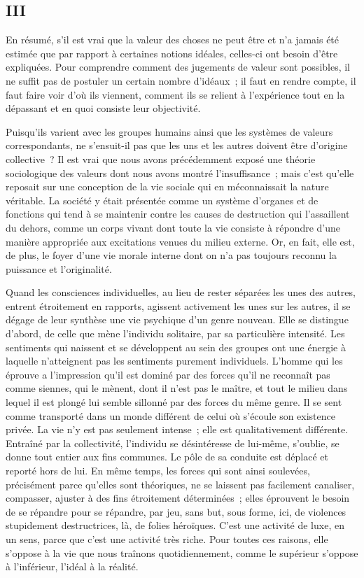 \documentclass[french,twoside]{book} %
\begin{document}
\subsection[{III}]{III}
\noindent En résumé, s’il est vrai que la valeur des choses ne peut être et n’a jamais été estimée que par rapport à certaines notions idéales, celles-ci ont besoin d’être expliquées. Pour comprendre comment des jugements de valeur sont possibles, il ne suffit pas de postuler un certain nombre d’idéaux ; il faut en rendre compte, il faut faire voir d’où ils viennent, comment ils se relient à l’expérience tout en la dépassant et en quoi consiste leur objectivité.\par
Puisqu’ils varient avec les groupes humains ainsi que les systèmes de valeurs correspondants, ne s’ensuit-il pas que les uns et les autres doivent être d’origine collective ? Il est vrai que nous avons précédemment exposé une théorie sociologique des valeurs dont nous avons montré l’insuffisance ; mais c’est qu’elle reposait sur une conception de la vie sociale qui en méconnaissait la nature véritable. La société y était présentée comme un système d’organes et de fonctions qui tend à se maintenir contre les causes de destruction qui l’assaillent du dehors, comme un corps vivant dont toute la vie consiste à répondre d’une manière appropriée aux excitations venues du milieu externe. Or, en fait, elle est, de plus, le foyer d’une vie morale interne dont on n’a pas toujours reconnu la puissance et l’originalité.\par
Quand les consciences individuelles, au lieu de rester séparées les unes des autres, entrent étroitement en rapports, agissent activement les unes sur les autres, il se dégage de leur synthèse une vie psychique d’un genre nouveau. Elle se distingue d’abord, de celle que mène l’individu solitaire, par sa particulière intensité. Les sentiments qui naissent et se développent au sein des groupes ont une énergie à laquelle n’atteignent pas les sentiments purement individuels. L’homme qui les éprouve a l’impression qu’il est dominé par des forces qu’il ne reconnaît pas comme siennes, qui le mènent, dont il n’est pas le maître, et tout le milieu dans lequel il est plongé lui semble sillonné par des forces du même genre. Il se sent comme transporté dans un monde différent de celui où s’écoule son existence privée. La vie n’y est pas seulement intense ; elle est qualitativement différente. Entraîné par la collectivité, l’individu se désintéresse de lui-même, s’oublie, se donne tout entier aux fins communes. Le pôle de sa conduite est déplacé et reporté hors de lui. En même temps, les forces qui sont ainsi soulevées, précisément parce qu’elles sont théoriques, ne se laissent pas facilement canaliser, compasser, ajuster à des fins étroitement déterminées ; elles éprouvent le besoin de se répandre pour se répandre, par jeu, sans but, sous forme, ici, de violences stupidement destructrices, là, de folies héroïques. C’est une activité de luxe, en un sens, parce que c’est une activité très riche. Pour toutes ces raisons, elle s’oppose à la vie que nous traînons quotidiennement, comme le supérieur s’oppose à l’inférieur, l’idéal à la réalité.\par
\end{document}
